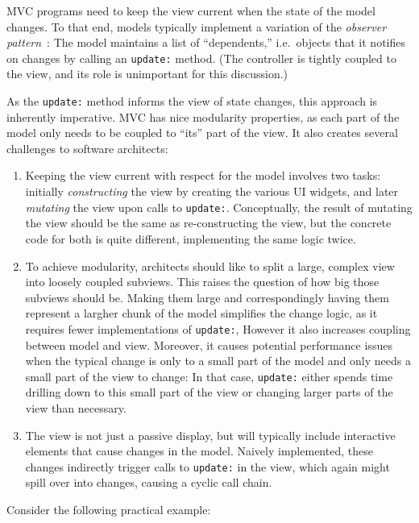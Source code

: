 \documentclass[sigplan,screen]{acmart}
\begin{document}
MVC programs need to keep the view current when the state of the model
changes.  To that end, models typically implement a variation of the
\textit{observer pattern}~\cite{GoF}: The model maintains a list of
``dependents,'' i.e.\ objects that it notifies on changes by calling
an \texttt{update:} method.  (The controller is tightly coupled to the
view, and its role is unimportant for this discussion.)

As the \texttt{update:} method informs the view of state changes, this
approach is inherently imperative.  MVC has nice modularity
properties, as each part of the model only needs to be coupled to
``its'' part of the view.  It also creates several challenges to
software architects:
\label{sec:challenges}
%
\begin{enumerate}
\item Keeping the view current with respect for the model involves two
  tasks: initially \emph{constructing} the view by creating the
  various UI widgets, and later \emph{mutating} the view upon calls to
  \texttt{update:}.  Conceptually, the result of mutating the view
  should be the same as re-constructing the view, but the concrete
  code for both is quite different, implementing the same logic twice.
\item To achieve modularity, architects should like to split a large,
  complex view into loosely coupled subviews.  This raises the
  question of how big those subviews should be. Making them large and
  correspondingly having them represent a largher chunk of the model
  simplifies the change logic, as it requires fewer implementations of
  \texttt{update:}, However it also increases coupling between model
  and view.  Moreover, it causes potential performance issues when the
  typical change is only to a small part of the model and only needs a
  small part of the view to change: In that case, \texttt{update:}
  either spends time drilling down to this small part of the view or
  changing larger parts of the view than necessary.
\item The view is not just a passive display, but will typically
  include interactive elements that cause changes in the model.
  Naively implemented, these changes indirectly trigger calls to
  \texttt{update:} in the view, which again might spill over into
  changes, causing a cyclic call chain.
\end{enumerate}
%
Consider the following practical example:
%
\end{document}
